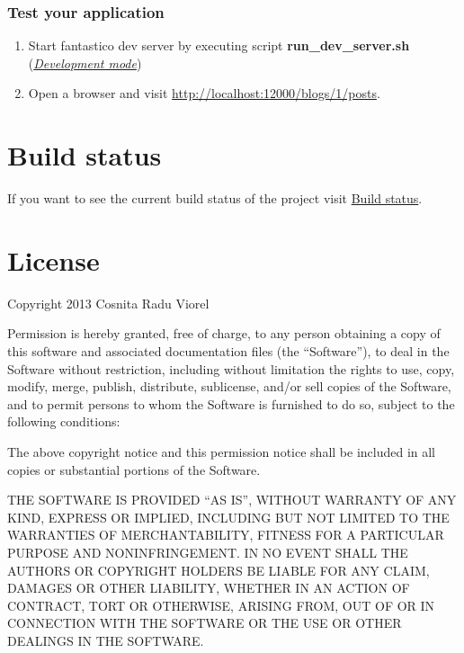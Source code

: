 \documentclass[letterpaper,10pt,english]{sphinxmanual}
\begin{document}
\subsection{Test your application}
\label{how_to/mvc_how_to:test-your-application}\begin{enumerate}
\item {} 
Start fantastico dev server by executing script \textbf{run\_dev\_server.sh} ({\hyperref[get_started/dev_mode::doc]{\emph{Development mode}}})

\item {} 
Open a browser and visit \href{http://localhost:12000/blogs/1/posts}{http://localhost:12000/blogs/1/posts}.

\end{enumerate}


\chapter{Build status}
\label{index:build-status}
If you want to see the current build status of the project visit \href{http://jenkins.scrum-expert.ro:8080/job/fantastico-framework/badge/icon/}{Build status}.


\chapter{License}
\label{index:license}
Copyright 2013 Cosnita Radu Viorel

Permission is hereby granted, free of charge, to any person obtaining a copy of this software and associated
documentation files (the ``Software''), to deal in the Software without restriction, including without limitation
the rights to use, copy, modify, merge, publish, distribute, sublicense, and/or sell copies of the Software,
and to permit persons to whom the Software is furnished to do so, subject to the following conditions:

The above copyright notice and this permission notice shall be included in all copies or substantial portions of the Software.

THE SOFTWARE IS PROVIDED ``AS IS'', WITHOUT WARRANTY OF ANY KIND, EXPRESS OR IMPLIED, INCLUDING BUT NOT LIMITED TO THE
WARRANTIES OF MERCHANTABILITY, FITNESS FOR A PARTICULAR PURPOSE AND NONINFRINGEMENT. IN NO EVENT SHALL THE AUTHORS OR
COPYRIGHT HOLDERS BE LIABLE FOR ANY CLAIM, DAMAGES OR OTHER LIABILITY, WHETHER IN AN ACTION OF CONTRACT, TORT OR OTHERWISE,
ARISING FROM, OUT OF OR IN CONNECTION WITH THE SOFTWARE OR THE USE OR OTHER DEALINGS IN THE SOFTWARE.



\renewcommand{\indexname}{Index}
\printindex
\end{document}
